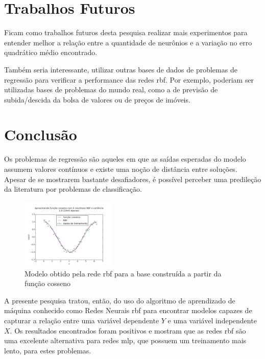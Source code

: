\documentclass[conference]{IEEEtran}
\begin{document}
\section{Trabalhos Futuros}
\label{trabalhos_futuros}

Ficam como trabalhos futuros desta pesquisa realizar mais experimentos para 
entender melhor a relação entre a quantidade de neurônios e a variação no erro 
quadrático médio encontrado.

Também seria interessante, utilizar outras bases de dados de problemas de 
regressão para verificar a performance das redes \ac*{rbf}. Por exemplo, 
poderiam ser utilizadas bases de problemas do mundo real, como a de previsão 
de subida/descida da bolsa de valores ou de preços de imóveis.

\section{Conclusão}
\label{conclusao}

Os problemas de regressão são aqueles em que as saídas esperadas do modelo 
assumem valores contínuos e existe uma noção de distância entre soluções. Apesar 
de se mostrarem bastante desafiadores, é possível perceber uma predileção da 
literatura por problemas de classificação.

\begin{figure}[b]
	\caption{Modelo obtido pela rede \ac*{rbf} para a base construída a partir 
		da função cosseno}
	\label{fig:rsl_cos}
	\centering
	\includegraphics[width=0.40\textwidth]{cos_5v1_all_paper}
\end{figure}

A presente pesquisa tratou, então, do uso do algoritmo de aprendizado de máquina 
conhecido como Redes Neurais \ac*{rbf} para encontrar modelos capazes de 
capturar a relação entre uma variável dependente $Y$ e uma variável independente 
$X$. Os resultados encontrados foram positivos e mostram que as redes \ac*{rbf} 
são uma excelente alternativa para redes \ac*{mlp}, que possuem um treinamento 
mais lento, para estes problemas.
\end{document}
